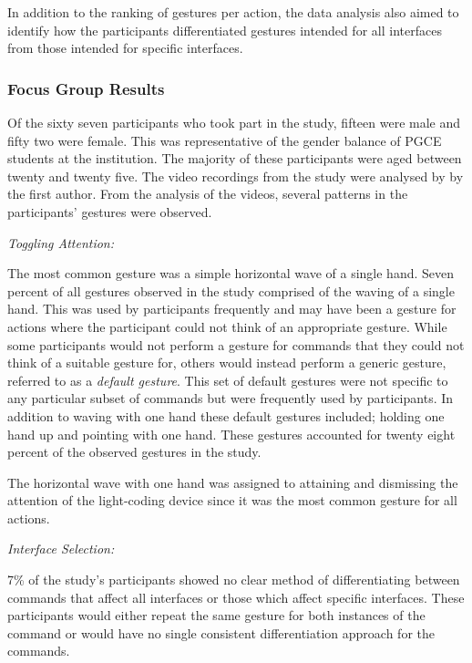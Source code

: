 \documentclass[link]{IWCOMP}
\begin{document}
In addition to the ranking of gestures per action, the data analysis also aimed to identify how the participants differentiated gestures intended for all interfaces from those intended for specific interfaces.

\subsubsection{Focus Group Results}
\label{subsubsec:focusGroupResults}


Of the sixty seven participants who took part in the study, fifteen were male and fifty two were female.
This was representative of the gender balance of \ac{PGCE} students at the institution.
The majority of these participants were aged between twenty and twenty five.
The video recordings from the study were analysed by by the first author.
From the analysis of the videos, several patterns in the participants' gestures were observed.

\emph{Toggling Attention:}

The most common gesture was a simple horizontal wave of a single hand.
Seven percent of all gestures observed in the study comprised of the waving of a single hand.
This was used by participants frequently and may have been a gesture for actions where the participant could not think of an appropriate gesture. 
While some participants would not perform a gesture for commands that they could not think of a suitable gesture for, others would instead perform a generic gesture, referred to as a \textit{default gesture}.
This set of default gestures were not specific to any particular subset of commands but were frequently used by participants.
In addition to waving with one hand these default gestures included; holding one hand up and pointing with one hand.
These gestures accounted for twenty eight percent of the observed gestures in the study.

The horizontal wave with one hand was assigned to attaining and dismissing the attention of the light-coding device since it was the most common gesture for all actions.

\emph{Interface Selection:}

7\% of the study's participants showed no clear method of differentiating between commands that affect all interfaces or those which affect specific interfaces. 
These participants would either repeat the same gesture for both instances of the command or would have no single consistent differentiation approach for the commands. 
\end{document}
